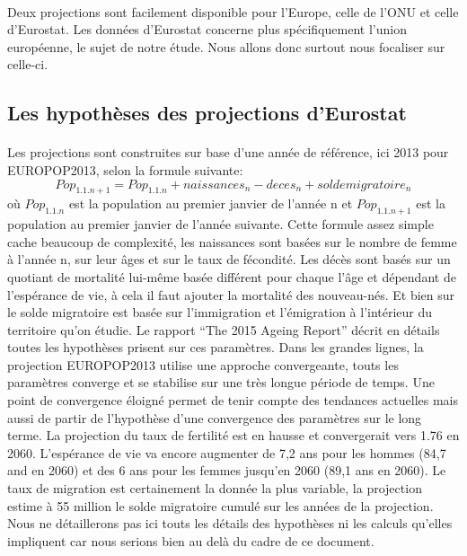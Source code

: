 \paragraph{}Deux projections sont facilement disponible pour l’Europe, celle de l’ONU\citep{onu} et celle d’Eurostat\citep{eurostat_europop13}. Les données d’Eurostat concerne plus spécifiquement l’union européenne, le sujet de notre étude. Nous allons donc surtout nous focaliser sur celle-ci.  

\subsection{Les hypothèses des projections d’Eurostat}
\paragraph{}Les projections sont construites sur base d’une année de référence, ici 2013 pour EUROPOP2013\citep{eurostat_europop13}, selon la formule suivante:
$$ Pop_{1.1.n+1} = Pop_{1.1.n} + naissances_{n} - deces_{n} + solde migratoire_{n} $$ \citep[pp.3]{INSEE}
où $Pop_{1.1.n}$ est la population au premier janvier de l'année n et $Pop_{1.1.n+1}$ est la population au premier janvier de l'année suivante. Cette formule assez simple cache beaucoup de complexité, les naissances sont basées sur le nombre de femme à l’année n, sur leur âges et sur le taux de fécondité. Les décès sont basés sur un quotiant de mortalité lui-même basée différent pour chaque l’âge et dépendant de l’espérance de vie, à cela il faut ajouter la mortalité des nouveau-nés\citep[pp.4]{INSEE}. Et bien sur le solde migratoire est basée sur l’immigration et l’émigration à l’intérieur du territoire qu’on étudie. Le rapport “The 2015 Ageing Report” décrit en détails toutes les hypothèses prisent sur ces paramètres\citep[pp.8-14]{ageing_methodo}. Dans les grandes lignes, la projection EUROPOP2013 utilise une approche convergeante, touts les paramètres converge et se stabilise sur une très longue période de temps. Une point de convergence éloigné permet de tenir compte des tendances actuelles mais aussi de partir de l’hypothèse d’une convergence des paramètres sur le long terme. La projection du taux de fertilité est en hausse et convergerait vers 1.76 en 2060\citep[pp.9]{ageing_methodo}. L’espérance de vie va encore augmenter de 7,2 ans pour les hommes (84,7 and en 2060) et des 6 ans pour les femmes jusqu’en 2060 (89,1 ans en 2060)\citep[pp.11]{ageing_methodo}. Le taux de migration est certainement la donnée la plus variable, la projection estime à 55 million le solde migratoire cumulé sur les années de la projection\citep[pp.14]{ageing_methodo}. Nous ne détaillerons pas ici touts les détails des hypothèses ni les calculs qu’elles impliquent car nous serions bien au delà du cadre de ce document. 

